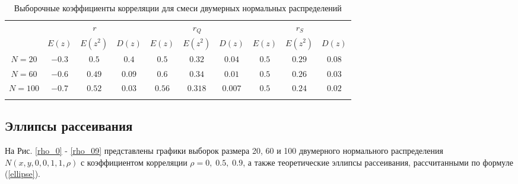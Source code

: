 \documentclass[12pt]{article}
\begin{document}
\begin{flushleft}
        \begin{table}[h]
            \begin{center}
                \begin{tabular}{||c||*{3}{c|}|*{3}{c|}|*{3}{c|}|} \hhline{~|t:===:t:===:t:===:t|}
                \multicolumn{1}{c||}{} & \multicolumn{3}{c||}{$r$} & \multicolumn{3}{c||}{$r_Q$} & \multicolumn{3}{c||}{$r_S$}\\ 
                \hhline{~||---||---||---||}
                \multicolumn{1}{c||}{} & $E(z)$ & $E(z^2)$ & $D(z)$ & $E(z)$ & $E(z^2)$ & $D(z)$ & $E(z)$ & $E(z^2)$ & $D(z)$\\ 
                \hhline{|t:=::===::===::===:|}

                $N = 20$ & $-0.3$ & $0.5$ & $0.4$ & $0.5$ & $0.32$ & $0.04$ & $0.5$ & $0.29$ & $0.08$\\
                \hhline{||-||---||---||---||}
                $N = 60$ & $-0.6$ & $0.49$ & $0.09$ & $0.6$ & $0.34$ & $0.01$ & $0.5$ & $0.26$ & $0.03$\\
                \hhline{||-||---||---||---||}
                $N = 100$ & $-0.7$ & $0.52$ & $0.03$ & $0.56$ & $0.318$ & $0.007$ & $0.5$ & $0.24$ & $0.02$\\
                \hhline{|b:=:b:===:b:===:b:===:b|}
                \end{tabular}
            \caption{Выборочные коэффициенты корреляции для смеси двумерных нормальных распределений}
            \label{table_mix_normal}
            \end{center}
        \end{table}

    \subsection{Эллипсы рассеивания}

    На Рис. \ref{rho_0} - \ref{rho_09} представлены графики выборок размера 20, 60 и 100 двумерного нормального распределения $N(x, y, 0, 0, 1, 1, \rho)$ с коэффициентом корреляции $\rho = 0, \; 0.5, \; 0.9$, а также теоретические эллипсы рассеивания, рассчитанными по формуле (\ref{ellipse}).

    \newpage


\end{flushleft}
\end{document}
